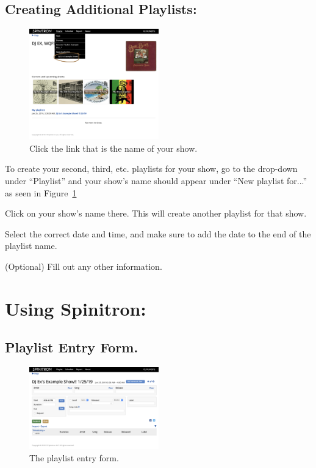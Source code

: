 \documentclass[12pt]{article}
\begin{document}
\subsection{Creating Additional Playlists:}

\begin{figure}
    \includegraphics[width=0.5\textwidth]{images/Second_Playlist.png}
    \caption{Click the link that is the name of your show.}
    \label{fig13}
\end{figure}

To create your second, third, etc. playlists for your show, go to the drop-down under ``Playlist'' and your show's name should appear under ``New playlist for...'' as seen in Figure~\ref{fig13}

Click on your show's name there. This will create another playlist for that show.

Select the correct date and time, and make sure to add the date to the end of the playlist name.

(Optional) Fill out any other information.

\clearpage
\newpage

\section{Using Spinitron:}

\subsection{Playlist Entry Form.}

\begin{figure}
    \includegraphics[width=0.5\textwidth]{images/Playlist_entry_form.png}
    \caption{The playlist entry form.}
    \label{fig14}
\end{figure}
\end{document}
